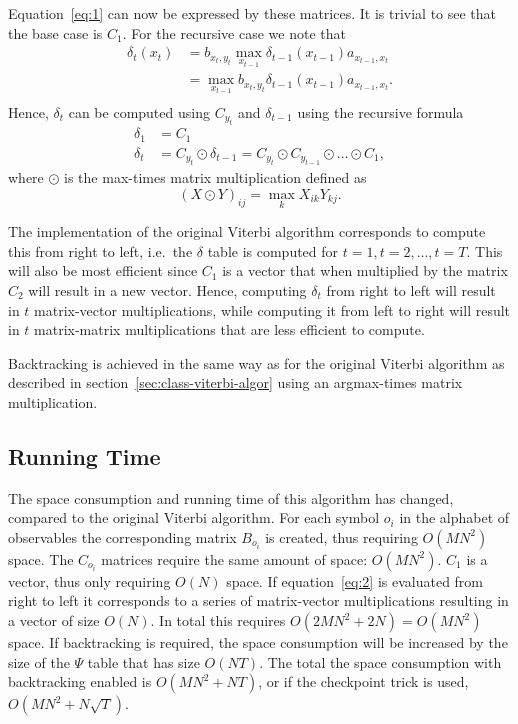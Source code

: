 Equation~\eqref{eq:1} can now be expressed by these matrices. It is trivial to
see that the base case is $C_1$. For the recursive case we note that
\begin{equation*}
  \begin{aligned}
    \delta_t(x_t) & = b_{x_t, y_t} \max_{x_{t - 1}} \delta_{t - 1}(x_{t - 1}) a_{x_{t - 1}, x_t} \\
                  & =  \max_{x_{t - 1}} b_{x_t, y_t} \delta_{t - 1}(x_{t - 1}) a_{x_{t - 1}, x_t}. \\
  \end{aligned}
\end{equation*}
Hence, $\delta_t$ can be computed using $C_{y_t}$ and $\delta_{t - 1}$ using
the recursive formula
\begin{equation}
  \label{eq:2}
  \begin{aligned}
    \delta_1 &= C_1 \\
    \delta_t &= C_{y_t} \odot \delta_{t - 1} = C_{y_t} \odot C_{y_{t-1}} \odot \dots \odot C_1,
  \end{aligned}
\end{equation}
where $\odot$ is the max-times matrix multiplication defined as
\begin{equation*}
{(X \odot Y)}_{ij} = \max_k X_{ik} Y_{kj}.
\end{equation*}

The implementation of the original Viterbi algorithm corresponds to
compute this from right to left, i.e.\ the $\delta$ table is computed for $t
= 1, t=2, \dots, t=T$. This will also be most efficient since
$C_1$ is a vector that when multiplied by the matrix $C_2$ will result in a new
vector. Hence, computing $\delta_t$ from right to left will result in $t$
matrix-vector multiplications, while computing it from left to right will
result in $t$ matrix-matrix multiplications that are less efficient to compute.

Backtracking is achieved in the same way as for the original Viterbi algorithm
as described in section~\ref{sec:class-viterbi-algor} using an argmax-times
matrix multiplication.

\subsection{Running Time}

The space consumption and running time of this algorithm has changed, compared
to the original Viterbi algorithm. For each symbol $o_i$ in the alphabet of
observables the corresponding matrix $B_{o_i}$ is created, thus requiring
$O(M N^2)$ space. The $C_{o_i}$ matrices require the same amount of space:
$O(M N^2)$. $C_1$ is a vector, thus only requiring $O(N)$ space. If
equation~\eqref{eq:2} is evaluated from right to left it corresponds to a
series of matrix-vector multiplications resulting in a vector of size $O(N)$.
In total this requires $O(2 M N^2 + 2 N) = O(M N^2)$ space. If backtracking is
required, the space consumption will be increased by the size of the $\Psi$
table that has size $O(N T)$. The total the space consumption with backtracking
enabled is $O(M N^2 + N T)$, or if the checkpoint trick is used, $O(M N^2 +
N \sqrt{T})$.

